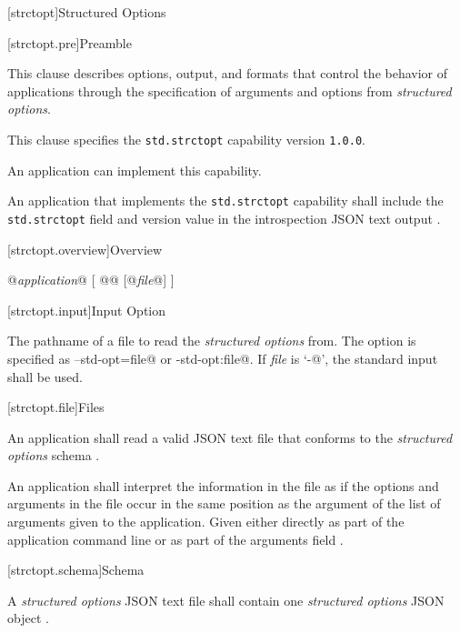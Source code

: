 
[strctopt]{Structured Options}


[strctopt.pre]{Preamble}

\pnum
This clause describes options, output, and formats that control the behavior of
applications through the specification of arguments and options from
\emph{structured options}.

\pnum
This clause specifies the \verb|std.strctopt| capability 
version \verb|1.0.0|.

\pnum
An application can implement this capability.

\pnum
An application that implements the \verb|std.strctopt| capability shall include
the \verb|std.strctopt| field and version value in the introspection JSON text
output .

[strctopt.overview]{Overview}

\pnum
\begin{outputblock}
@\emph{application}@ [ @@ [@\emph{file}@] ]
\end{outputblock}

[strctopt.input]{Input Option}

\pnum
{}
\begin{indented}
	The pathname of a file to read the \emph{structured options} from. The
	option is specified as \verb@--std-opt=file@ or \verb@-std-opt:file@. If
	\emph{file} is ‘\verb@-@’, the standard input shall be used.
\end{indented}

[strctopt.file]{Files}

\pnum
An application shall read a valid JSON text file that conforms to the
\emph{structured options} schema .

\pnum
An application shall interpret the information in the file as if the options
and arguments in the file occur in the same position as the
 argument of the list of arguments given to
the application. Given either directly as part of the application command line
or as part of the arguments field .

[strctopt.schema]{Schema}

\pnum
A \emph{structured options} JSON text file shall contain one \emph{structured
options} JSON object .

